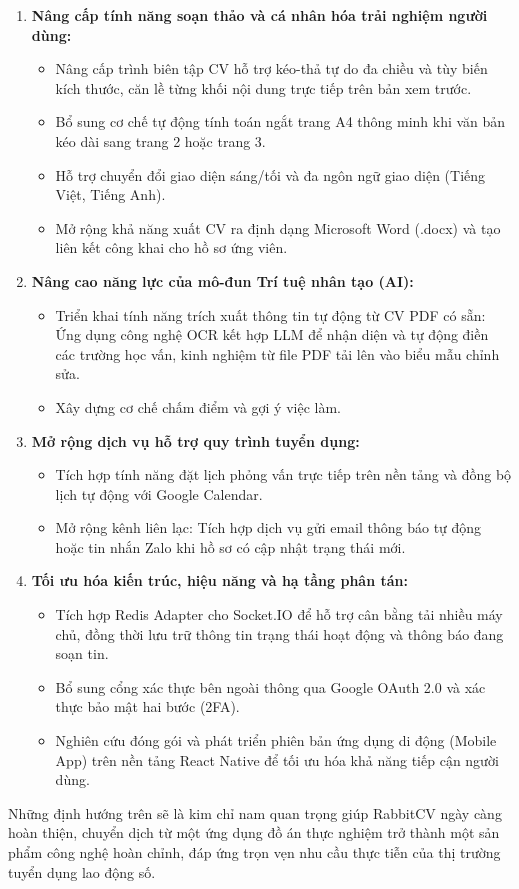 \begin{enumerate}
    \item \textbf{Nâng cấp tính năng soạn thảo và cá nhân hóa trải nghiệm người dùng:}
    \begin{itemize}
        \item Nâng cấp trình biên tập CV hỗ trợ kéo-thả tự do đa chiều và tùy biến kích thước, căn lề từng khối nội dung trực tiếp trên bản xem trước.
        \item Bổ sung cơ chế tự động tính toán ngắt trang A4 thông minh khi văn bản kéo dài sang trang 2 hoặc trang 3.
        \item Hỗ trợ chuyển đổi giao diện sáng/tối và đa ngôn ngữ giao diện (Tiếng Việt, Tiếng Anh).
        \item Mở rộng khả năng xuất CV ra định dạng Microsoft Word (.docx) và tạo liên kết công khai cho hồ sơ ứng viên.
    \end{itemize}

    \item \textbf{Nâng cao năng lực của mô-đun Trí tuệ nhân tạo (AI):}
    \begin{itemize}
        \item Triển khai tính năng trích xuất thông tin tự động từ CV PDF có sẵn: Ứng dụng công nghệ OCR kết hợp LLM để nhận diện và tự động điền các trường học vấn, kinh nghiệm từ file PDF tải lên vào biểu mẫu chỉnh sửa.
        \item Xây dựng cơ chế chấm điểm và gợi ý việc làm.
    \end{itemize}

    \item \textbf{Mở rộng dịch vụ hỗ trợ quy trình tuyển dụng:}
    \begin{itemize}
        \item Tích hợp tính năng đặt lịch phỏng vấn trực tiếp trên nền tảng và đồng bộ lịch tự động với Google Calendar.
        \item Mở rộng kênh liên lạc: Tích hợp dịch vụ gửi email thông báo tự động hoặc tin nhắn Zalo khi hồ sơ có cập nhật trạng thái mới.
    \end{itemize}

    \item \textbf{Tối ưu hóa kiến trúc, hiệu năng và hạ tầng phân tán:}
    \begin{itemize}
        \item Tích hợp Redis Adapter cho Socket.IO để hỗ trợ cân bằng tải nhiều máy chủ, đồng thời lưu trữ thông tin trạng thái hoạt động và thông báo đang soạn tin.
        \item Bổ sung cổng xác thực bên ngoài thông qua Google OAuth 2.0 và xác thực bảo mật hai bước (2FA).
        \item Nghiên cứu đóng gói và phát triển phiên bản ứng dụng di động (Mobile App) trên nền tảng React Native để tối ưu hóa khả năng tiếp cận người dùng.
    \end{itemize}
\end{enumerate}

Những định hướng trên sẽ là kim chỉ nam quan trọng giúp RabbitCV ngày càng hoàn thiện, chuyển dịch từ một ứng dụng đồ án thực nghiệm trở thành một sản phẩm công nghệ hoàn chỉnh, đáp ứng trọn vẹn nhu cầu thực tiễn của thị trường tuyển dụng lao động số.
